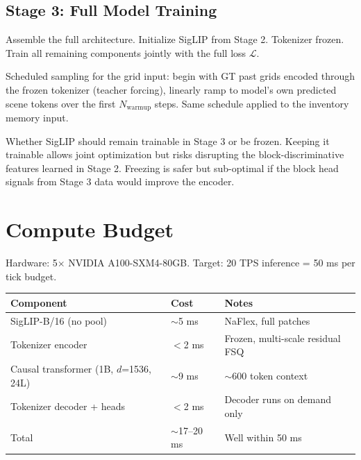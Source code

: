 \documentclass[11pt,a4paper]{article}
\begin{document}
\subsection{Stage 3: Full Model Training}

Assemble the full architecture. Initialize SigLIP from Stage 2. Tokenizer frozen. Train all remaining components jointly with the full loss $\mathcal{L}$.

Scheduled sampling for the grid input: begin with GT past grids encoded through the frozen tokenizer (teacher forcing), linearly ramp to model's own predicted scene tokens over the first $N_\text{warmup}$ steps. Same schedule applied to the inventory memory input.

\begin{openquestion}
Whether SigLIP should remain trainable in Stage 3 or be frozen. Keeping it trainable allows joint optimization but risks disrupting the block-discriminative features learned in Stage 2. Freezing is safer but sub-optimal if the block head signals from Stage 3 data would improve the encoder.
\end{openquestion}

\section{Compute Budget}
\label{sec:compute}

Hardware: 5$\times$ NVIDIA A100-SXM4-80GB. Target: 20 TPS inference = 50 ms per tick budget.

\begin{center}
\begin{tabular}{lll}
\toprule
Component & Cost & Notes \\
\midrule
SigLIP-B/16 (no pool) & $\sim$5 ms & NaFlex, full patches \\
Tokenizer encoder & $<$2 ms & Frozen, multi-scale residual FSQ \\
Causal transformer (1B, $d$=1536, 24L) & $\sim$9 ms & $\sim$600 token context \\
Tokenizer decoder + heads & $<$2 ms & Decoder runs on demand only \\
\midrule
Total & $\sim$17--20 ms & Well within 50 ms \\
\bottomrule
\end{tabular}
\end{center}
\end{document}
